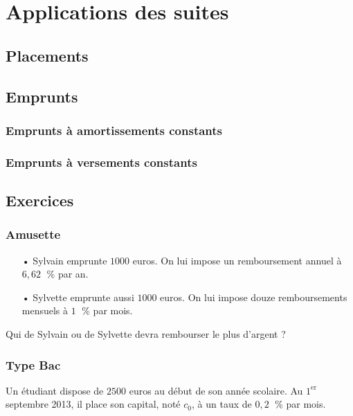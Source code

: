 \section{Applications des suites}

\subsection{Placements}

\subsection{Emprunts}

\subsubsection{Emprunts à amortissements constants}

\subsubsection{Emprunts à versements constants}

\subsection{Exercices}

\subsubsection{Amusette}

\begin{itemize}
\item[•] Sylvain emprunte $1 000$ euros. On lui impose un remboursement annuel à $6,62 \;$ \% par an. \\
\item[•] Sylvette emprunte aussi $1 000$ euros. On lui impose douze remboursements mensuels à $1 \;$ \% par mois. \\
\end{itemize}

Qui de Sylvain ou de Sylvette devra rembourser le plus d'argent ? \\

\subsubsection{Type Bac}

Un étudiant dispose de $2500$ euros au début de son année scolaire. Au $1^{\mathrm{er}}$ septembre 2013, il place son capital, noté $c_0$, à un taux de $0,2 \;$ \% par mois. \\

